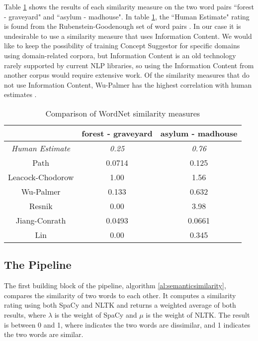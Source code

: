 \documentclass{article}
\begin{document}
Table \ref{table:wordnetsimilarity} shows the results of each similarity measure on the two word pairs ``forest - graveyard" and ``asylum - madhouse". In table \ref{table:wordnetsimilarity}, the ``Human Estimate" rating is found from the Rubenstein-Goodenough set of word pairs \cite{rubenstein1965contextual}. In our case it is undesirable to use a similarity measure that uses Information Content. We would like to keep the possibility of training Concept Suggestor for specific domains using domain-related corpora, but Information Content is an old technology rarely supported by current NLP libraries, so using the Information Content from another corpus would require extensive work. Of the similarity measures that do not use Information Content, Wu-Palmer has the highest correlation with human estimates \citep{budanitsky2006evaluating,seco2004intrinsic,mihalcea2006corpus}. %

\begin{table}[h!]
\centering
\begin{tabular}{|c||c|c|}
	\hline
	& forest - graveyard & asylum - madhouse \\
	\hline
	\textit{Human Estimate} & \textit{0.25} & \textit{0.76} \\
	Path & 0.0714 & 0.125 \\
	Leacock-Chodorow & 1.00 & 1.56 \\
	Wu-Palmer & 0.133 & 0.632 \\
	Resnik & 0.00 & 3.98 \\
	Jiang-Conrath & 0.0493 & 0.0661 \\
	Lin & 0.00 & 0.345 \\
	\hline
\end{tabular}
\caption{Comparison of WordNet similarity measures} %
\label{table:wordnetsimilarity}
\end{table}

\subsection{The Pipeline}

The first building block of the pipeline, algorithm \ref{al:semanticsimilarity}, compares the similarity of two words to each other. It computes a similarity rating using both SpaCy and NLTK and returns a weighted average of both results, where $\lambda$ is the weight of SpaCy and $\mu$ is the weight of NLTK. The result is between 0 and 1, where indicates the two words are dissimilar, and 1 indicates the two words are similar.
\end{document}
